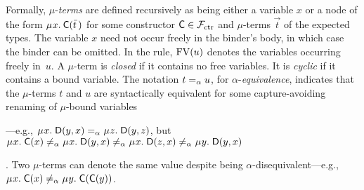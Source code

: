 Formally, $\mu$-\emph{terms} are defined recursively as being either a variable $x$
or a node of the form
$\MU x.\: \const{C}( \vec t\, )$ for some constructor $\textsf{C} \in \mathcal{F}_{\smash{\mathrm{ctr}}}$ and
$\mu$-terms $\vec t$ of the expected types.
The variable $x$ need not occur freely in the binder's body, in which case
the binder can be omitted.
In the  rule,
$\mathrm{FV}( u )$ denotes the variables occurring freely in~$u$.
%
%
%
A $\mu$-term is \emph{closed} if %
it contains no free variables. \hfill It is \emph{cyclic} if %
it contains a bound variable. \hfill The
\goodbreak %
\noindent
notation $t \mathrel{=_\alpha} u$, for $\alpha$-\emph{equivalence},
indicates that the $\mu$-terms $t$ and $u$
are syntactically equivalent for some capture-avoiding renaming of $\mu$-bound variables\begin{rep}---e.g.,
$\MU x.\; \const{D}( y, x ) \aequiv \MU z.\; \const{D}( y, z )$,
but
$\MU x.\; \const{C}( x ) \not\aequiv \MU x.\; \const{D}( y, x ) \not\aequiv \MU x.\; \const{D}( z, x )
\not\aequiv \MU y.\; \const{D}( y, x )$\end{rep}.
Two $\mu$-terms can denote the same value despite being $\alpha$-disequivalent---e.g.,
$\MU x.\; \const{C}( x ) \not\aequiv \MU y.\; \const{C}( \const{C}( y ) )$.

